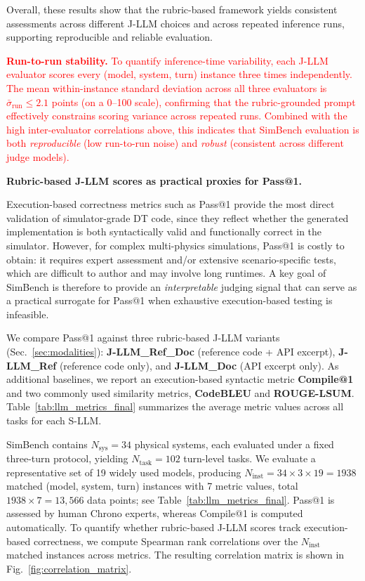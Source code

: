 \documentclass{ieeeaccess}
\newcommand{\updatedText}[1]{\textcolor{red}{#1}}
\newcommand{\noindentBold}[1]{\par\noindent\textbf{#1}}
\begin{document}
Overall, these results show that the rubric-based framework yields consistent assessments across different J-LLM choices and across repeated inference runs, supporting reproducible and reliable evaluation. 

\updatedText{\noindentBold{Run-to-run stability.}
To quantify inference-time variability, each J-LLM evaluator scores every (model, system, turn) instance three times independently.
The mean within-instance standard deviation across all three evaluators is $\bar{\sigma}_{\text{run}} \leq 2.1$ points (on a 0--100 scale), confirming that the rubric-grounded prompt effectively constrains scoring variance across repeated runs.
Combined with the high inter-evaluator correlations above, this indicates that SimBench evaluation is both \emph{reproducible} (low run-to-run noise) and \emph{robust} (consistent across different judge models).}

\medskip


{\noindentBold{Rubric-based J-LLM scores as practical proxies for Pass@1.}}
Execution-based correctness metrics such as Pass@1 provide the most direct validation of simulator-grade DT code, since they reflect whether the generated implementation is both syntactically valid and functionally correct in the simulator.
However, for complex multi-physics simulations, Pass@1 is costly to obtain: it requires expert assessment and/or extensive scenario-specific tests, which are difficult to author and may involve long runtimes.
A key goal of SimBench is therefore to provide an \emph{interpretable} judging signal that can serve as a practical surrogate for Pass@1 when exhaustive execution-based testing is infeasible.

We compare Pass@1 against three rubric-based J-LLM variants (Sec.~\ref{sec:modalities}): \textbf{J-LLM\_Ref\_Doc} (reference code + API excerpt), \textbf{J-LLM\_Ref} (reference code only), and \textbf{J-LLM\_Doc} (API excerpt only).
As additional baselines, we report an execution-based syntactic metric \textbf{Compile@1} and two commonly used similarity metrics, \textbf{CodeBLEU} and \textbf{ROUGE-LSUM}.
Table~\ref{tab:llm_metrics_final} summarizes the average metric values across all tasks for each S-LLM.

SimBench contains $N_{\text{sys}}=34$ physical systems, each evaluated under a fixed three-turn protocol, yielding $N_{\text{task}}=102$ turn-level tasks.
We evaluate a representative set of 19 widely used models, producing
$N_{\text{inst}} = 34 \times 3 \times 19 = 1938$ matched (model, system, turn) instances with 7 metric values, total $1938 \times 7 = 13,566$ data points; see Table~\ref{tab:llm_metrics_final}.
Pass@1 is assessed by human Chrono experts, whereas Compile@1 is computed automatically.
To quantify whether rubric-based J-LLM scores track execution-based correctness, we compute Spearman rank correlations over the $N_{\text{inst}}$ matched instances across metrics.
The resulting correlation matrix is shown in Fig.~\ref{fig:correlation_matrix}.
\end{document}
